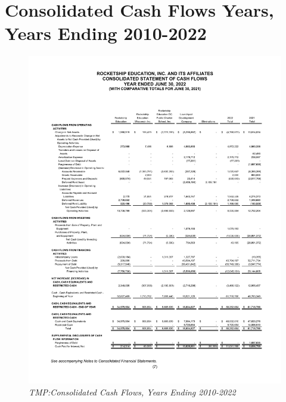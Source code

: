 
\chapter{Consolidated Cash Flows Years, Years Ending 2010-2022}


\begin{figure}[hbt]
  \caption[TMP:Consolidated Cash Flows, Years Ending 2010–2022]{\textit{TMP:Consolidated Cash Flows, Years Ending 2010-2022}}\label{fig:consolidated_cash_flows_2010-2022} %
  \includegraphics{Consolidated_Cash_Flows_Years_2010-2022} %
\end{figure}

